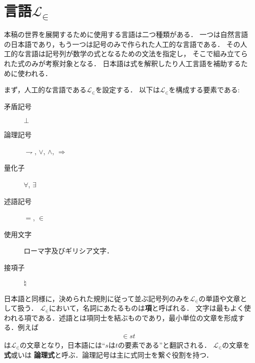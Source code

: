 \chapter{言語$\mathcal{L}_{\in}$}

	本稿の世界を展開するために使用する言語は二つ種類がある．
	一つは自然言語の日本語であり，もう一つは記号のみで作られた人工的な言語である．
	その人工的な言語は記号列が数学の式となるための文法を指定し，
	そこで組み立てられた式のみが考察対象となる．
	日本語は式を解釈したり人工言語を補助するために使われる．
	
	まず，人工的な言語である$\mathcal{L}_{\in}$を設定する．
	以下は$\mathcal{L}_{\in}$を構成する要素である:
	\begin{description}
		\item[矛盾記号] $\bot$
		\item[論理記号] $\rightharpoondown$, $\vee$, $\wedge$, $\Longrightarrow$
		\item[量化子] $\forall$, $\exists$
		\item[述語記号] $=$, $\in$
		\item[使用文字] ローマ字及びギリシア文字．
		\item[接項子] $\natural$
	\end{description}
	
	日本語と同様に，決められた規則に従って並ぶ記号列のみを$\mathcal{L}_{\in}$の単語や文章として扱う．
	$\mathcal{L}_{\in}$において，名詞にあたるものは{\bf 項}と呼ばれる．
	文字は最もよく使われる項である．述語とは項同士を結ぶものであり，最小単位の文章を形成する．例えば
	\begin{align}
		\in st
	\end{align}
	は$\mathcal{L}_{\in}$の文章となり，日本語には``$s$は$t$の要素である''と翻訳される．
	$\mathcal{L}_{\in}$の文章を{\bf 式}或いは
	{\bf 論理式}と呼ぶ．論理記号は主に式同士を繋ぐ役割を持つ．
	
